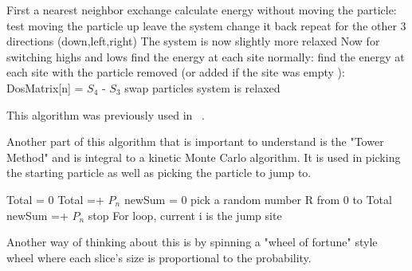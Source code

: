 \begin{varwidth}{\dimexpr{}\fboxrule\relax}
\begin{algorithmic}[1]
\State First a nearest neighbor exchange
\State calculate energy without moving the particle:
\State test moving the particle up
\State leave the system
\Else
\State change it back
\EndIf
\State repeat for the other 3 directions (down,left,right)
\EndIf
\EndFor
\State The system is now slightly more relaxed
\State Now for switching highs and lows
\State find the energy at each site normally:
\State find the energy at each site with the particle removed (or added if the site was empty ):
\State DosMatrix[n] = $S_4$ - $S_3$
\EndFor
{}
\State swap particles
\Else
\State system is relaxed
\EndIf
\EndWhile



This algorithm was previously used in ~\cite{glatz08}. 

\end{algorithmic}
\end{varwidth}%

Another part of this algorithm that is important to understand is the "Tower Method" and is integral to a kinetic Monte Carlo algorithm. It is used in picking the starting particle as well as picking the particle to jump to.







\begin{varwidth}{\dimexpr{}\fboxrule\relax}
\begin{algorithmic}[1]
\State Total = 0
\State Total =+ $P_n$
\EndFor
\State newSum = 0
\State pick a random number R from 0 to Total
\State newSum =+ $P_n$
\State stop For loop, current i is the jump site
\EndIf
\EndFor




Another way of thinking about this is by spinning a "wheel of fortune" style wheel where each slice's size is proportional to the probability.
\end{algorithmic}
\end{varwidth}%

